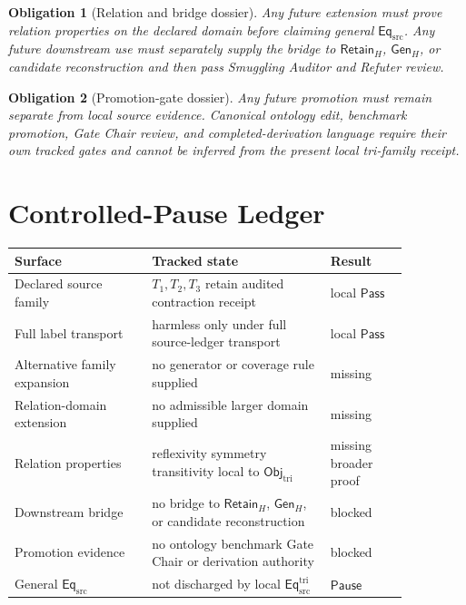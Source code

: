\documentclass[11pt]{article}
\newcommand{\EqSrc}{\mathsf{Eq}_{\mathrm{src}}}
\newcommand{\EqTri}{\mathsf{Eq}_{\mathrm{src}}^{\mathrm{tri}}}
\newcommand{\ObjTri}{\mathsf{Obj}_{\mathrm{tri}}}
\newcommand{\RetainH}{\mathsf{Retain}_{H}}
\newcommand{\GenH}{\mathsf{Gen}_{H}}
\newcommand{\Pass}{\mathsf{Pass}}
\newcommand{\Pause}{\mathsf{Pause}}
\newtheorem{obligation}{Obligation}
\begin{document}
\begin{obligation}[Relation and bridge dossier]
Any future extension must prove relation properties on the declared
domain before claiming general \(\EqSrc\). Any future downstream use
must separately supply the bridge to \(\RetainH\), \(\GenH\), or
candidate reconstruction and then pass Smuggling Auditor and Refuter
review.
\end{obligation}

\begin{obligation}[Promotion-gate dossier]
Any future promotion must remain separate from local source evidence.
Canonical ontology edit, benchmark promotion, Gate Chair review, and
completed-derivation language require their own tracked gates and cannot
be inferred from the present local tri-family receipt.
\end{obligation}

\section{Controlled-Pause Ledger}

\begin{center}
\begin{tabular}{p{0.30\linewidth}p{0.39\linewidth}p{0.17\linewidth}}
\textbf{Surface} & \textbf{Tracked state} & \textbf{Result} \\
\hline
Declared source family & \(T_{1},T_{2},T_{3}\) retain audited contraction receipt & local \(\Pass\) \\
Full label transport & harmless only under full source-ledger transport & local \(\Pass\) \\
Alternative family expansion & no generator or coverage rule supplied & missing \\
Relation-domain extension & no admissible larger domain supplied & missing \\
Relation properties & reflexivity symmetry transitivity local to \(\ObjTri\) & missing broader proof \\
Downstream bridge & no bridge to \(\RetainH\), \(\GenH\), or candidate reconstruction & blocked \\
Promotion evidence & no ontology benchmark Gate Chair or derivation authority & blocked \\
General \(\EqSrc\) & not discharged by local \(\EqTri\) & \(\Pause\) \\
\end{tabular}
\end{center}
\end{document}
